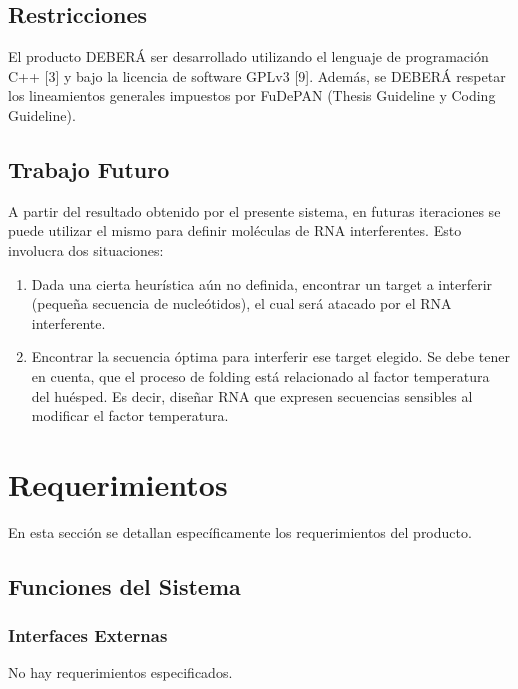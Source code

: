 \documentclass[12pt,a4paper,english,spanish]{article}
\begin{document}
\subsection{Restricciones}
	El producto DEBERÁ ser desarrollado utilizando el lenguaje de programación C++ [3] y bajo la licencia de software 		GPLv3 [9]. Además, se DEBERÁ respetar los lineamientos generales impuestos por FuDePAN (Thesis Guideline y Coding Guideline). 

\subsection{Trabajo Futuro}
A partir del resultado obtenido por el presente sistema, en futuras iteraciones se puede utilizar el mismo para definir moléculas de RNA interferentes. Esto involucra dos situaciones:
\begin{enumerate}
	\item Dada una cierta heurística aún no definida, encontrar un target a interferir (pequeña secuencia de nucleótidos), el cual será atacado por el RNA 			interferente.
	\item Encontrar la secuencia óptima para interferir ese target elegido. Se debe tener en cuenta, que el proceso de folding está relacionado 			al factor temperatura del huésped. Es decir, diseñar RNA que expresen secuencias sensibles al modificar el factor temperatura.
\end{enumerate}


\section{Requerimientos}
\label{section-req} 
En esta sección se detallan específicamente los requerimientos del producto. 

\subsection{Funciones del Sistema}

	\subsubsection{Interfaces Externas}
		No hay requerimientos especificados.
		
\end{document}
